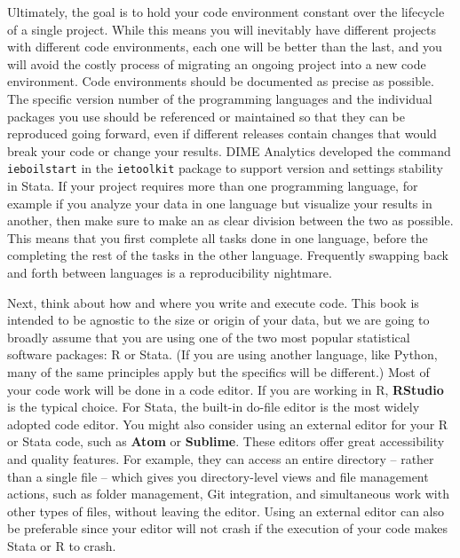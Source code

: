 Ultimately, the goal is to hold your code environment constant
over the lifecycle of a single project.
While this means you will inevitably have different projects
with different code environments, each one will be better than the last,
and you will avoid the costly process of migrating an ongoing project
into a new code environment.
Code environments should be documented as precise as possible.
The specific version number of the programming languages and the individual packages you use
should be referenced or maintained so that they can be reproduced going forward,
even if different releases contain changes that would break your code
or change your results.
DIME Analytics developed the command \texttt{ieboilstart} in the \texttt{ietoolkit} package
to support version and settings stability in Stata.
If your project requires more than one programming language,
for example if you analyze your data in one language but visualize your results in another,
then make sure to make an as clear division between the two as possible.
This means that you first complete all tasks done in one language,
before the completing the rest of the tasks in the other language.
Frequently swapping back and forth between languages is a reproducibility nightmare.

Next, think about how and where you write and execute code.
This book is intended to be agnostic to the size or origin of your data,
but we are going to broadly assume that you are using
one of the two most popular statistical software packages: R or Stata.
(If you are using another language, like Python,
many of the same principles apply but the specifics will be different.)
Most of your code work will be done in a code editor.
If you are working in R, \textbf{RStudio} is the typical choice.
For Stata, the built-in do-file editor is the most widely adopted code editor.
You might also consider using an external editor for your R or Stata code, such as
\textbf{Atom} or
\textbf{Sublime}.
These editors offer great accessibility and quality features.
For example, they can access an entire directory -- rather than a single file --
which gives you directory-level views and file management actions,
such as folder management, Git integration,
and simultaneous work with other types of files, without leaving the editor.
Using an external editor can also be preferable since your editor will not crash
if the execution of your code makes Stata or R to crash.

